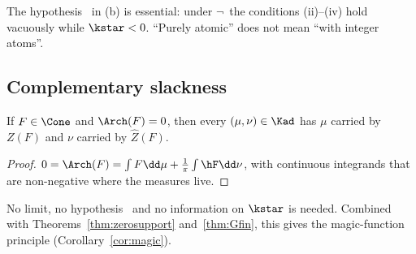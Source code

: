 The hypothesis \condE\ in (b) is essential: under $\neg$\condE\ the conditions (ii)--(iv) hold vacuously while $\kstar<0$.
``Purely atomic'' does not mean ``with integer atoms''.

\subsection{Complementary slackness}

\begin{lemma}\label{lem:compslack}
If $F\in\Cone$ and $\Arch(F)=0$, then every $(\mu,\nu)\in\Kad$ has $\mu$ carried by $Z(F)$ and $\nu$ carried by $\widehat Z(F)$.
\end{lemma}

\begin{proof}
$0=\Arch(F)=\int F\dd\mu+\frac1\pi\int\hF\dd\nu$, with continuous integrands that are non-negative where the measures live.
\end{proof}

No limit, no hypothesis \condE\ and no information on $\kstar$ is needed. Combined with Theorems~\ref{thm:zerosupport} and~\ref{thm:Gfin}, this
gives the magic-function principle (Corollary~\ref{cor:magic}).
